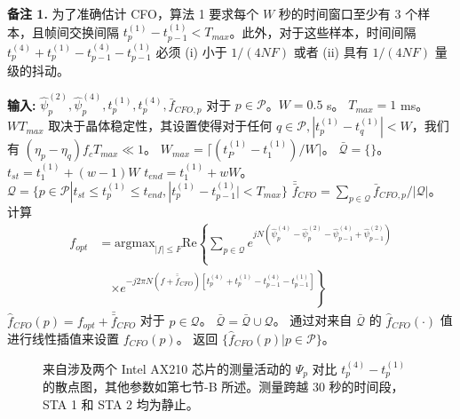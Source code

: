 \documentclass[journal]{IEEEtran}
\begin{document}
\textbf{备注 1.} 为了准确估计 CFO，算法 1 要求每个 $W$ 秒的时间窗口至少有 3 个样本，且帧间交换间隔 $t_p^{(1)} - t_{p-1}^{(1)} < T_{max}$。此外，对于这些样本，时间间隔 $t_p^{(4)} + t_p^{(1)} - t_{p-1}^{(4)} - t_{p-1}^{(1)}$ 必须 (i) 小于 $1/(4NF)$ 或者 (ii) 具有 $1/(4NF)$ 量级的抖动。

\begin{algorithm}
\caption{CFO $\hat{f}_{CFO}(p)$ 的估计}
\begin{algorithmic}[1]
\STATE \textbf{输入:} $\hat{\psi}_p^{(2)}, \hat{\psi}_p^{(4)}, t_p^{(1)}, t_p^{(4)}, \bar{f}_{CFO,p}$ 对于 $p \in \mathcal{P}$。$W=0.5$ s。
\STATE $T_{max}=1$ ms。$WT_{max}$ 取决于晶体稳定性，其设置使得对于任何 $q \in \mathcal{P}, |t_p^{(1)} - t_q^{(1)}| < W$，我们有 $(\eta_p - \eta_q) f_c T_{max} \ll 1$。
\STATE $W_{max} = \lceil (t_P^{(1)} - t_1^{(1)})/W \rceil$。
\STATE $\mathcal{\bar{Q}} = \{\}$。
    \STATE $t_{st} = t_1^{(1)} + (w-1)W$
    \STATE $t_{end} = t_1^{(1)} + wW$。
    \STATE $\mathcal{Q} = \{p \in \mathcal{P} | t_{st} \le t_p^{(1)} \le t_{end}, |t_p^{(1)} - t_{p-1}^{(1)}| < T_{max}\}$
    \STATE $\bar{\bar{f}}_{CFO} = \sum_{p \in \mathcal{Q}} \bar{f}_{CFO,p} / |\mathcal{Q}|$。
    \STATE 计算
    \begin{align}
    f_{opt} &= \text{argmax}_{|f| \le F} \text{Re} \left\{ \sum_{p \in \mathcal{Q}} e^{jN(\hat{\psi}_p^{(4)} - \hat{\psi}_p^{(2)} - \hat{\psi}_{p-1}^{(4)} + \hat{\psi}_{p-1}^{(2)})} \right. \nonumber \\
    &\quad \left. \times e^{-j2\pi N(f+\bar{\bar{f}}_{CFO})[t_p^{(4)} + t_p^{(1)} - t_{p-1}^{(4)} - t_{p-1}^{(1)}]} \right\} \label{eq:8}
    \end{align}
    \STATE $\hat{f}_{CFO}(p) = f_{opt} + \bar{\bar{f}}_{CFO}$ 对于 $p \in \mathcal{Q}$。
    \STATE $\mathcal{\bar{Q}} = \mathcal{\bar{Q}} \cup \mathcal{Q}$。
\ENDFOR
{}
    \STATE 通过对来自 $\mathcal{\bar{Q}}$ 的 $\hat{f}_{CFO}(\cdot)$ 值进行线性插值来设置 $f_{CFO}(p)$。
\ENDFOR
\STATE 返回 $\{\hat{f}_{CFO}(p) | p \in \mathcal{P}\}$。
\end{algorithmic}
\end{algorithm}

\begin{figure}[htbp]
\centering
{}
\caption{来自涉及两个 Intel AX210 芯片的测量活动的 $\Psi_p$ 对比 $t_p^{(4)} - t_p^{(1)}$ 的散点图，其他参数如第七节-B 所述。测量跨越 30 秒的时间段，STA 1 和 STA 2 均为静止。}
\label{fig:fig6}
\end{figure}
\end{document}
